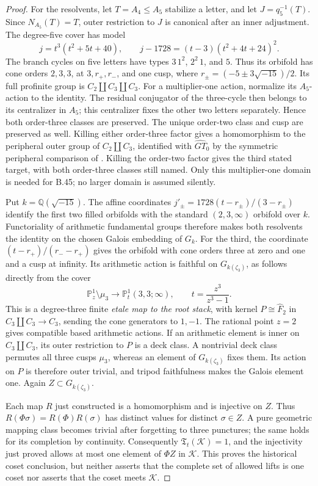 \begin{proof}
For the resolvents, let \(T=A_4\le A_5\) stabilize a letter, and
let \(J=q_5^{-1}(T)\). Since \(N_{A_5}(T)=T\), outer restriction
to \(J\) is canonical after an inner adjustment. The degree-five
cover has model
\[
 j=t^3(t^2+5t+40),\qquad
 j-1728=(t-3)(t^2+4t+24)^2.
\]
The branch cycles on five letters have types \(3\,1^2\),
\(2^2\,1\), and \(5\). Thus its orbifold has cone orders
\(2,3,3\), at \(3,r_+,r_-\), and one cusp, where
\(r_\pm=(-5\pm3\sqrt{-15})/2\).
Its full profinite group is \(C_2\amalg C_3\amalg C_3\).
For a multiplier-one action, normalize its \(A_5\)-action to the
identity. The residual conjugator of the three-cycle then belongs to
its centralizer in \(A_5\); this centralizer fixes the other two
letters separately. Hence both order-three classes are preserved.
The unique order-two class and cusp are preserved as well.
Killing either order-three factor gives a homomorphism to the
peripheral outer group of \(C_2\amalg C_3\), identified with
\(\widehat{GT}_0\) by the symmetric peripheral comparison of
\citet[\S1.3, Propositions 3--4]{SymHarbaterSchneps2000}.
Killing the order-two factor gives the third stated target, with both
order-three classes still named. Only this multiplier-one domain is
needed for B.45; no larger domain is assumed silently.

Put \(k=\mathbb Q(\sqrt{-15})\). The affine coordinates
\(j'_\pm=1728(t-r_\pm)/(3-r_\pm)\) identify the first two
filled orbifolds with the standard \((2,3,\infty)\) orbifold over
\(k\). Functoriality of arithmetic fundamental groups therefore
makes both resolvents the identity on the chosen Galois embedding of
\(G_k\). For the third, the coordinate
\((t-r_+)/(r_--r_+)\) gives the orbifold with cone orders three
at zero and one and a cusp at infinity. Its arithmetic action is
faithful on \(G_{k(\zeta_3)}\), as follows directly from the cover
\[
 \mathbb P^1_z\setminus\mu_3\longrightarrow
 \mathbb P^1_t(3,3;\infty),\qquad
 t=\frac{z^3}{z^3-1}.
\]
This is a degree-three finite \emph{etale map to the root stack},
with kernel \(P\cong\widehat F_2\) in
\(C_3\amalg C_3\to C_3\), sending the cone generators to
\(1,-1\). The rational point \(z=2\) gives compatible based
arithmetic actions. If an arithmetic element is inner on
\(C_3\amalg C_3\), its outer restriction to \(P\) is a deck
class. A nontrivial deck class permutes all three cusps \(\mu_3\),
whereas an element of \(G_{k(\zeta_3)}\) fixes them. Its action on
\(P\) is therefore outer trivial, and tripod faithfulness makes the
Galois element one. Again \(Z\subset G_{k(\zeta_3)}\).

Each map \(R\) just constructed is a homomorphism and is injective
on \(Z\). Thus \(R(\Phi\sigma)=R(\Phi)R(\sigma)\) has distinct
values for distinct \(\sigma\in Z\). A pure geometric mapping
class becomes trivial after forgetting to three punctures; the same
holds for its completion by continuity. Consequently
\(\mathfrak T_t(\mathcal K)=1\), and the injectivity just proved
allows at most one element of \(\Phi Z\) in \(\mathcal K\).
This proves the historical coset conclusion, but neither asserts that
the complete set of allowed lifts is one coset nor asserts that the
coset meets \(\mathcal K\).
\end{proof}

